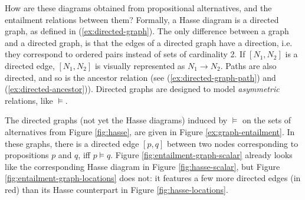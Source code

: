 How are these diagrams obtained from propositional alternatives, and the entailment relations between them? Formally, a Hasse diagram is a directed graph, as defined in (\ref{ex:directed-graph}). The only difference between a graph and a directed graph, is that the edges of a directed graph have a direction, i.e. they correspond to ordered pairs instead of sets of cardinality 2. If $[N_1, N_2]$ is a directed edge, $[N_1, N_2]$ is visually represented as $N_1 \rightarrow N_2$. Paths are also directed, and so is the ancestor relation (see (\ref{ex:directed-graph-path}) and (\ref{ex:directed-ancestor})). Directed graphs are designed to model \textit{asymmetric} relations, like $\vDash$.

\begin{exe}
	\label{ex:directed-graph}
	\label{ex:directed-graph-path}
	\label{ex:directed-ancestor}
\end{exe}

The directed graphs (not yet the Hasse diagrams) induced by $\vDash$ on the sets of alternatives from Figure \ref{fig:hasse}, are given in Figure \ref{ex:graph-entailment}. In these graphs, there is a directed edge $[p, q]$ between two nodes corresponding to propositions $p$ and $q$, iff $p \vDash q$. Figure \ref{fig:entailment-graph-scalar} already looks like the corresponding Hasse diagram in Figure \ref{fig:hasse-scalar}, but Figure  \ref{fig:entailment-graph-locations} does not: it features a few more directed edges (in red) than its Hasse counterpart in Figure \ref{fig:hasse-locations}.

